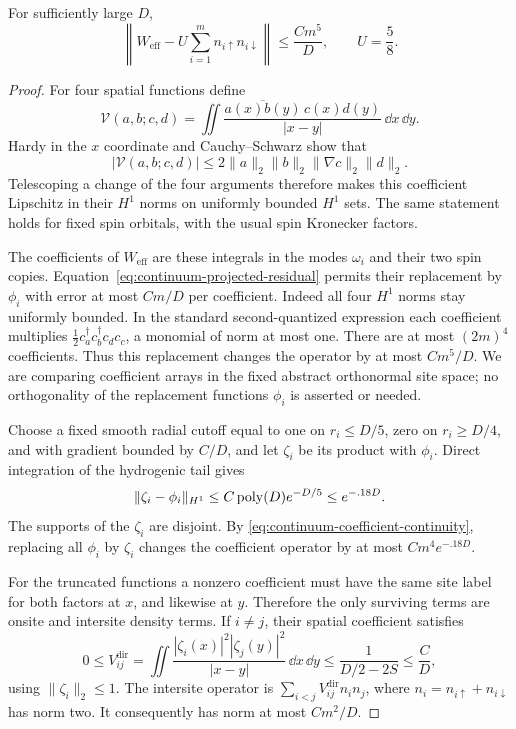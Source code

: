\begin{lemma}
\label{lem:continuum-coulomb-compression}
For sufficiently large \(D\),
\begin{equation}
 \left\|W_{\mathrm{eff}}
       -U\sum_{i=1}^m n_{i\uparrow}n_{i\downarrow}\right\|
 \le \frac{Cm^5}{D},\qquad U=\frac58 .
 \label{eq:continuum-coulomb-error}
\end{equation}
\end{lemma}

\begin{proof}
For four spatial functions define
\[
 \mathcal V(a,b;c,d)=
 \iint\frac{\overline{a(x)b(y)}\,c(x)d(y)}
                {|x-y|}\,\dd x\,\dd y.
\]
Hardy in the \(x\) coordinate and Cauchy--Schwarz show that
\begin{equation}
 |\mathcal V(a,b;c,d)|
 \le2\|a\|_2\|b\|_2\|\nabla c\|_2\|d\|_2.
 \label{eq:continuum-coefficient-continuity}
\end{equation}
Telescoping a change of the four arguments therefore makes
this coefficient Lipschitz in their \(H^1\) norms on uniformly
bounded \(H^1\) sets.  The same statement holds for fixed spin
orbitals, with the usual spin Kronecker factors.

The coefficients of \(W_{\mathrm{eff}}\) are these integrals
in the modes \(\omega_i\) and their two spin copies.
Equation~\eqref{eq:continuum-projected-residual} permits their
replacement by \(\phi_i\) with error at most \(Cm/D\) per
coefficient.  Indeed all four \(H^1\) norms stay uniformly
bounded.  In the standard second-quantized expression each
coefficient multiplies
\(\tfrac12c_a^\dagger c_b^\dagger c_d c_c\), a monomial
of norm at most one.  There are at most \((2m)^4\)
coefficients.  Thus this replacement changes the operator
by at most \(Cm^5/D\).
We are comparing coefficient arrays in the fixed abstract
orthonormal site space; no orthogonality of the replacement
functions \(\phi_i\) is asserted or needed.

Choose a fixed smooth radial cutoff equal to one on
\(r_i\le D/5\), zero on \(r_i\ge D/4\), and with gradient
bounded by \(C/D\), and let \(\zeta_i\) be its product with
\(\phi_i\).  Direct integration of the hydrogenic tail gives
\[
 \|\zeta_i-\phi_i\|_{H^1}
 \le C\operatorname{poly}(D)e^{-D/5}\le e^{-.18D}.
\]
The supports of the \(\zeta_i\) are disjoint.  By
\eqref{eq:continuum-coefficient-continuity}, replacing all
\(\phi_i\) by \(\zeta_i\) changes the coefficient operator by
at most \(Cm^4e^{-.18D}\).

For the truncated functions a nonzero coefficient must have
the same site label for both factors at \(x\), and likewise
at \(y\).  Therefore the only surviving terms are onsite
and intersite density terms.  If \(i\ne j\), their spatial
coefficient satisfies
\[
 0\le V_{ij}^{\mathrm{dir}}
 =\iint\frac{|\zeta_i(x)|^2|\zeta_j(y)|^2}{|x-y|}
                  \,\dd x\,\dd y
 \le\frac{1}{D/2-2S}\le\frac CD,
\]
using \(\|\zeta_i\|_2\le1\).
The intersite operator is
\(\sum_{i<j}V_{ij}^{\mathrm{dir}}n_i n_j\),
where \(n_i=n_{i\uparrow}+n_{i\downarrow}\) has norm two.
It consequently has norm at most \(Cm^2/D\).


\end{proof}
